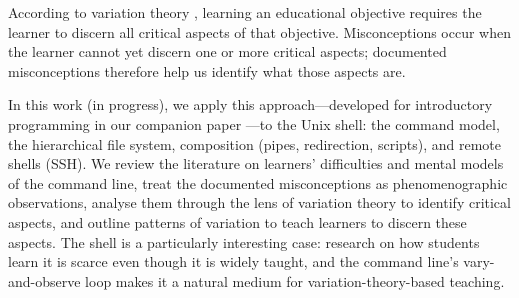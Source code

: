 According to variation theory \autocite[See][]{NCOL}, learning an educational
objective requires the learner to discern all critical aspects of that
objective. Misconceptions occur when the learner cannot yet discern one or
more critical aspects; documented misconceptions therefore help us identify
what those aspects are.

In this work (in progress), we apply this approach---developed for
introductory programming in our companion paper
\autocite{VTProgMisconceptions}---to the Unix shell: the command model, the
hierarchical file system, composition (pipes, redirection, scripts), and
remote shells (SSH). We review the literature on learners' difficulties and
mental models of the command line, treat the documented misconceptions as
phenomenographic observations, analyse them through the lens of variation
theory to identify critical aspects, and outline patterns of variation to
teach learners to discern these aspects. The shell is a particularly
interesting case: research on how students learn it is scarce even though it
is widely taught, and the command line's vary-and-observe loop makes it a
natural medium for variation-theory-based teaching.

